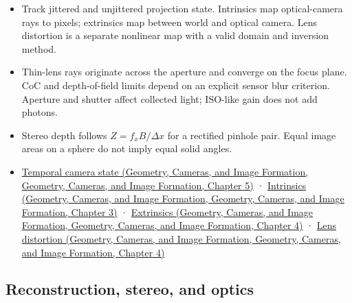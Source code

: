 \begin{itemize}
\tightlist
\item
  Track jittered and unjittered projection state. Intrinsics map optical-camera rays to pixels; extrinsics map between world and optical camera. Lens distortion is a separate nonlinear map with a valid domain and inversion method.
\item
  Thin-lens rays originate across the aperture and converge on the focus plane. CoC and depth-of-field limits depend on an explicit sensor blur criterion. Aperture and shutter affect collected light; ISO-like gain does not add photons.
\item
  Stereo depth follows \(Z=f_xB/\Delta x\) for a rectified pinhole pair. Equal image areas on a sphere do not imply equal solid angles.
\item
  \href{../03-Geometry-Cameras-and-Image-Formation/main.pdf\#nameddest=02-foundations-ii-ch036-a-camera-image-changes-over-time}{Temporal camera state (Geometry, Cameras, and Image Formation, Geometry, Cameras, and Image Formation, Chapter 5)} · \href{../03-Geometry-Cameras-and-Image-Formation/main.pdf\#nameddest=02-foundations-ii-ch034-intrinsics-map-optical-rays-to-pixels}{Intrinsics (Geometry, Cameras, and Image Formation, Geometry, Cameras, and Image Formation, Chapter 3)} · \href{../03-Geometry-Cameras-and-Image-Formation/main.pdf\#nameddest=02-foundations-ii-ch035-extrinsics-place-the-optical-camera-in-the-world}{Extrinsics (Geometry, Cameras, and Image Formation, Geometry, Cameras, and Image Formation, Chapter 4)} · \href{../03-Geometry-Cameras-and-Image-Formation/main.pdf\#nameddest=02-foundations-ii-ch035-real-lenses-bend-the-pinhole-image}{Lens distortion (Geometry, Cameras, and Image Formation, Geometry, Cameras, and Image Formation, Chapter 4)}
\end{itemize}

\subsection{Reconstruction, stereo, and optics}\label{appendix-a2b71a18f5a2-reconstruction-stereo-and-optics}

